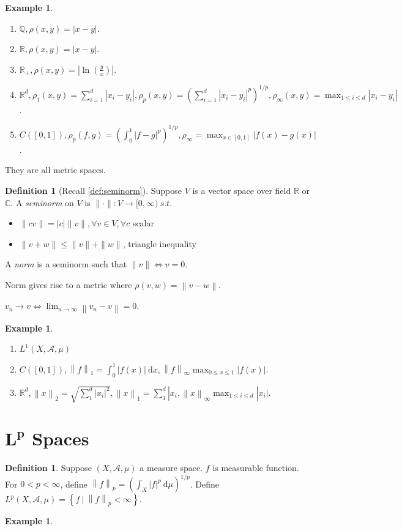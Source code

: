 \documentclass{report}
\newcommand{\R}{\mathbb{R}}
\newcommand{\C}{\mathbb{C}}
\newcommand{\Q}{\mathbb{Q}}
\newcommand{\st}{\ s.t.\ }
\newcommand{\cA}{\mathcal{A}}
\newcommand{\df}{\ \mathrm{d}}
\newcommand{\norm}[1]{\left\| #1 \right\|}
\theoremstyle{definition}
\newtheorem{definition}[theorem]{Definition}
\newtheorem{example}[theorem]{Example}
\theoremstyle{remark}
\newcommand{\fnl}{\parbox[t]{0\linewidth}{}}
\newcommand*\ttlmath[2]{\texorpdfstring{$\boldsymbol{#1}$}{#2}}
\begin{document}
\begin{example} \fnl
	\begin{enumerate}
		\item $\Q, \rho(x, y) = |x - y|$. 
		\item $\R, \rho(x, y) = |x - y|$.
		\item $\displaystyle \R_+, \rho(x, y) = \left| \ln \left(\frac{y}{x}\right) \right|$.
		\item $\displaystyle \R^d, \rho_1(x, y) = \sum_{i=1}^d |x_i - y_i|, \rho_p(x, y) = \left(\sum_{i=1}^d |x_i - y_i|^p\right)^{1/p}, \rho_\infty(x, y) = \max_{1 \leq i \leq d} |x_i - y_i|$.
		\item $\displaystyle C([0, 1]), \rho_p(f, g) = \left(\int_0^1 |f - g|^p\right)^{1/p}, \rho_\infty = \max_{x \in [0, 1]} |f(x) - g(x)|$.
	\end{enumerate}
	They are all metric spaces.
\end{example}

\begin{definition}[Recall \ref{def:seminorm}]
	Suppose $V$ is a vector space over field $\R$ or $\C$. A \emph{seminorm}
	on $V$ is $\|\cdot\|: V \to [0, \infty) \st$
	\begin{itemize}
	\item $\|cv\| = |c|\|v\|, \forall v \in V, \forall c$ scalar
	\item $\|v + w\| \leq \|v\| + \|w\|$, triangle inequality
	\end{itemize}
	A \emph{norm} is a seminorm such that $\|v\| \iff v = 0$.
\end{definition}

Norm gives rise to a metric where $\rho(v, w) = \norm{v - w}$.

$v_n \to v \iff \lim_{n \to \infty}\norm{v_n - v} = 0$.

\begin{example}
	\begin{enumerate}
		\item $L^1(X, \cA, \mu)$
		\item $C([0, 1]), \norm{f}_1 = \int_0^1 |f(x)|\df x, \norm{f}_\infty \max_{0 \leq x \leq 1} |f(x)|$.
		\item $\R^d, \norm{x}_2 = \sqrt{\sum_{1}^d |x_i|^2}, \norm{x}_1 = \sum_{1}^d|x_i, \norm{x}_\infty \max_{1 \leq i \leq d} |x_i|$.
	\end{enumerate}
\end{example}

\section{\ttlmath{L^p}{L\textasciicircum p} Spaces}
\begin{definition}
	Suppose $(X, \cA, \mu)$ a measure space. $f$ is measurable function. For $0 < p < \infty$, define $\displaystyle \norm{f}_p = \left(\int_{X} |f|^p \df \mu\right)^{1/p}$. Define $L^p(X, \cA, \mu) = \left\lbrace f\ \biggr\rvert\ \norm{f}_p < \infty\right\rbrace$.
\end{definition}
\begin{example}
	
\end{example}
\end{document}
